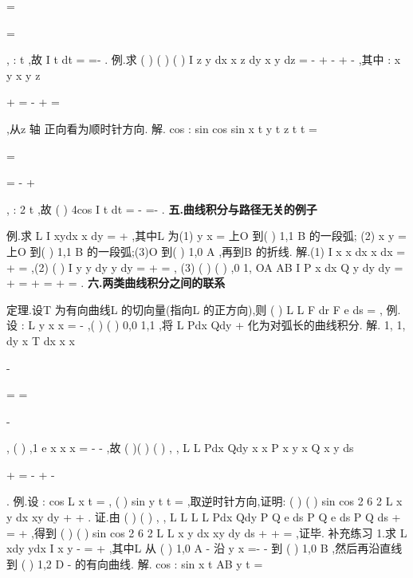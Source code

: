 \Gamma 
=

=

,
: \to 
t
,故
I
t dt
=
=-
\int 
. 
\textcolor{lyred}{例}.求
(
)
(
)
(
)
I
z
y dx
x
z dy
x
y dz
\Gamma 
=
-
+
-
+
-
\int \nabla 
,其中
:
x
y
x
y
z

+
=
\Gamma -
+
=

,从z 轴 
正向看为顺时针方向. 
解.
cos
:
sin
cos
sin
x
t
y
t
z
t
t
=


\Gamma 
=

=
-
+

, : 2
t
\pi \to 
,故
(
)
4cos
I
t
dt
\pi 
\pi 
=
-
=-
\int 
. 
\vspace{4pt}
{\bfseries \textcolor{lyred}{五.曲线积分与路径无关的例子}}

\textcolor{lyred}{例}.求
L
I
xydx
x dy
=
+
\int 
,其中L 为(1)
y
x
=
上O 到(
)
1,1
B
的一段弧; 
(2)
x
y
=
上O 到(
)
1,1
B
的一段弧;(3)O 到(
)
1,0
A
,再到B 的折线. 
解.(1)
I
x x dx
x
dx
=
\cdots 
+
\cdots 
=
\int 
,(2)
(
)
I
y
y dy
y
dy
=
\cdots 
\cdots 
+
=
\int 
, 
(3)
(
)
(
)
,0
1,
OA
AB
I
P x
dx
Q
y dy
dy
=
+
=
+
=
+
=
\int 
\int 
\int 
\int 
\int 
. 
\vspace{4pt}
{\bfseries \textcolor{lyred}{六.两类曲线积分之间的联系}}

\textcolor{lyred}{定理}.设T
\rho 
为有向曲线L 的\textcolor{lyred}{切向量}(指向L 的正方向),则
(
)
L
L
F dr
F e
ds
\tau 
\cdots 
=
\cdots 
\int 
\int 
\rho 
\rho 
\rho 
\rho 
, 
\textcolor{lyred}{例}.设
:
L y
x
x
=
-
,(
)
(
)
0,0
1,1
\to 
,将
L
Pdx
Qdy
+
\int 
化为对弧长的曲线积分. 
解.
1,
1,
dy
x
T
dx
x
x


-


=
=





-


\rho 
,
(
)
,1
e
x
x
x
\tau =
-
-
\rho 
,故 
(
)(
)
(
)
,
,
L
L
Pdx
Qdy
x
x P x y
x Q x y
ds


+
=
-
+
-


\int 
\int 
. 
\textcolor{lyred}{例}.设
:
cos
L x
t
=
,
(
)
sin
y
t
t
\pi 
=
\le \le 
,取逆时针方向,证明: 
(
)
(
)
sin
cos 2
6 2
L
x
y dx
xy
dy
+
+
\le 
\int \nabla 
. 
证.由
(
)
(
)
,
,
L
L
L
L
Pdx
Qdy
P Q
e ds
P Q
e ds
P
Q ds
\tau 
\tau 
+
=
\cdots 
\le 
\cdots 
\le 
+
\int 
\int 
\int 
\int 
\rho 
\rho 
\nabla 
\nabla 
\nabla 
\nabla 
,得到 
(
)
(
)
sin
cos 2
6 2
L
L
x
y dx
xy
dy
ds
+
+
\le 
=
\int 
\int 
\nabla 
\nabla 
,证毕. 
\textcolor{lyred}{补充练习 }
1.求
L
xdy
ydx
I
x
y
-
=
+
\int 
,其中L 从
(
)
1,0
A -
沿
y
x
=-
-
到
(
)
1,0
B
,然后再沿直线到 
(
)
1,2
D -
的有向曲线. 
解. \approx 
cos
:
sin
x
t
AB
y
t
=


